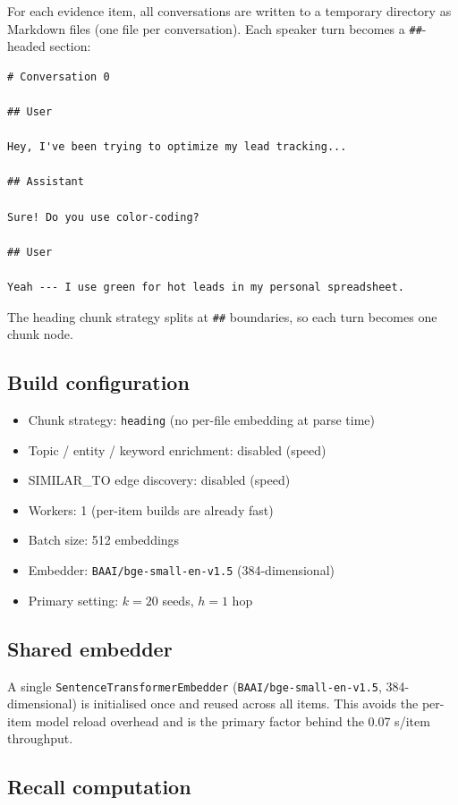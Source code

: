 \documentclass[11pt,a4paper]{article}
\begin{document}
For each evidence item, all conversations are written to a temporary directory as
Markdown files (one file per conversation).
Each speaker turn becomes a \texttt{\#\#}-headed section:

\begin{lstlisting}
# Conversation 0

## User

Hey, I've been trying to optimize my lead tracking...

## Assistant

Sure! Do you use color-coding?

## User

Yeah --- I use green for hot leads in my personal spreadsheet.
\end{lstlisting}

The heading chunk strategy splits at \texttt{\#\#} boundaries, so each turn becomes
one chunk node.

\subsection{Build configuration}

\begin{itemize}
  \item Chunk strategy: \texttt{heading} (no per-file embedding at parse time)
  \item Topic / entity / keyword enrichment: disabled (speed)
  \item SIMILAR\_TO edge discovery: disabled (speed)
  \item Workers: 1 (per-item builds are already fast)
  \item Batch size: 512 embeddings
  \item Embedder: \texttt{BAAI/bge-small-en-v1.5} (384-dimensional)
  \item Primary setting: $k{=}20$ seeds, $h{=}1$ hop
\end{itemize}

\subsection{Shared embedder}

A single \texttt{SentenceTransformerEmbedder}
(\texttt{BAAI/bge-small-en-v1.5}, 384-dimensional)
is initialised once and reused across all items.
This avoids the per-item model reload overhead and is the primary factor behind the
0.07 s/item throughput.

\subsection{Recall computation}
\end{document}
